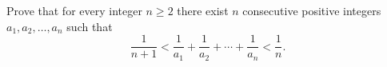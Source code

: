 Prove that for every integer $n\ge2$ there exist $n$ consecutive positive integers $a_1,a_2,\dots,a_n$ such that
\[\dfrac{1}{n+1}<\dfrac{1}{a_1}+\dfrac{1}{a_2}+\cdots+\dfrac{1}{a_n}<\dfrac1n.\]
